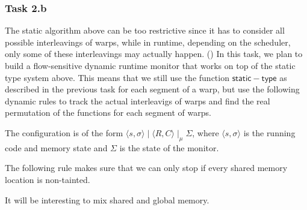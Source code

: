 \subsubsection{Task 2.b} 
The static algorithm above can be too restrictive since it has to consider all possible interleavings of warps, while in runtime, depending on the scheduler, only some of these interleavings may actually happen. 
%
()
In this task, we plan to build a flow-sensitive dynamic runtime monitor
that works on top of the static type system above.
%
This means that we still use the function $\mathsf{static-type}$ as described in the previous task for each segment of a warp, but use the following dynamic rules to track the actual interleavigs of warps and find the real permutation of the functions for each segment of warps.

The configuration is of the form $\langle s, \sigma \rangle \mid \langle R,C \rangle  \mid_\mu  \Sigma$, where $\langle s, \sigma \rangle$ is the running code and  memory state and $\Sigma $ is the state of the monitor.

\begin{mathpar}
\end{mathpar}

\begin{mathpar}
\end{mathpar}



The following rule makes sure that we can only stop if every shared memory location is non-tainted.
\begin{mathpar}
\end{mathpar}

It will be interesting to mix shared and global memory.


